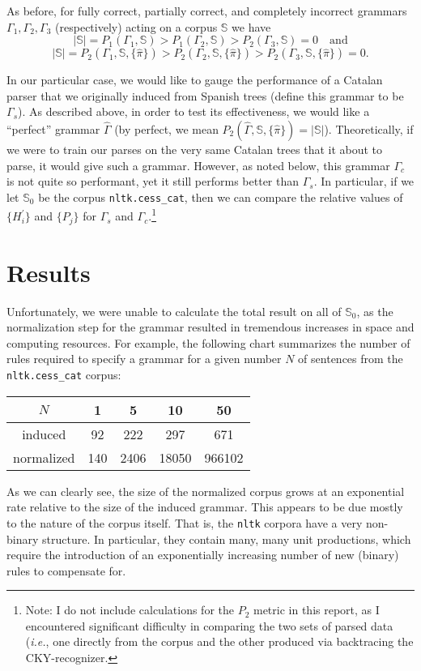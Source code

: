 \documentclass[paper=a4, fontsize=11pt]{scrartcl} %
\newcommand{\gcat}{\Gamma_{c}}
\newcommand{\gesp}{\Gamma_{s}}
\begin{document}
As before, for fully correct, partially correct, and completely incorrect grammars $\Gamma_1, \Gamma_2, \Gamma_3$ (respectively) acting on a corpus $\mathbb{S}$ we have $$ |\mathbb{S}| = P_1(\Gamma_1,\mathbb{S}) > P_1(\Gamma_2,\mathbb{S}) > P_2(\Gamma_3,\mathbb{S}) = 0 \quad\mbox{and}$$ $$ |\mathbb{S}| = P_2(\Gamma_1,\mathbb{S},\{ \hat{\pi} \}) > P_2(\Gamma_2,\mathbb{S},\{ \hat{\pi} \}) > P_2(\Gamma_3,\mathbb{S},\{ \hat{\pi} \}) = 0. $$

In our particular case, we would like to gauge the performance of a Catalan parser that we originally induced from Spanish trees (define this grammar to be $\gesp$).  As described above, in order to test its effectiveness, we would like a ``perfect'' grammar $\hat{\Gamma}$ (by perfect, we mean $P_2(\hat{\Gamma},\mathbb{S},\{ \hat{\pi} \}) = | \mathbb{S} |$).  Theoretically, if we were to train our parses on the very same Catalan trees that it about to parse, it would give such a grammar.  However, as noted below, this grammar $\gcat$ is not quite so performant, yet it still performs better than $\gesp$.  In particular, if we let $\mathbb{S}_0$ be the corpus \texttt{nltk.cess\_cat}, then we can compare the relative values of $\{ H_i^\prime \}$ and $\{ P_j \}$ for $\gesp$ and $\gcat$.\footnote{Note: I do not include calculations for the $P_2$ metric in this report, as I encountered significant difficulty in comparing the two sets of parsed data (\textit{i.e.}, one directly from the corpus and the other produced via backtracing the CKY-recognizer.}

\section*{Results}

Unfortunately, we were unable to calculate the total result on all of $\mathbb{S}_0$, as the normalization step for the grammar resulted in tremendous increases in space and computing resources.  For example, the following chart summarizes the number of rules required to specify a grammar for a given number $N$ of sentences from the \texttt{nltk.cess\_cat} corpus:
\begin{center}
    \begin{tabular}{|c|cccc|}
        \hline
        $N$ & 1 & 5 & 10 & 50 \\
        \hline
        induced & 92 & 222 & 297 & 671 \\
        normalized & 140 & 2406 & 18050 & 966102 \\
        \hline
    \end{tabular}
\end{center}
As we can clearly see, the size of the normalized corpus grows at an exponential rate relative to the size of the induced grammar.  This appears to be due mostly to the nature of the corpus itself.  That is, the \texttt{nltk} corpora have a very non-binary structure.  In particular, they contain many, many unit productions, which require the introduction of an exponentially increasing number of new (binary) rules to compensate for.
\end{document}
